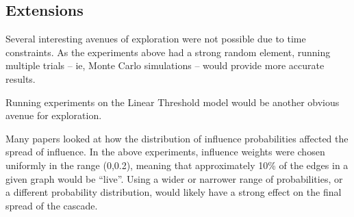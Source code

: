 \subsection{Extensions}

Several interesting avenues of exploration were not possible due to time constraints. 
As the experiments above had a strong random element, running multiple trials -- ie, Monte Carlo simulations -- would provide more accurate results.

Running experiments on the Linear Threshold model would be another obvious avenue for exploration.

Many papers looked at how the distribution of influence probabilities affected the spread of influence. In the above experiments, influence weights were chosen uniformly in the range (0,0.2), meaning that approximately 10\% of the edges in a given graph would be ``live''. Using a wider or narrower range of probabilities, or a different probability distribution, would likely have a strong effect on the final spread of the cascade.


